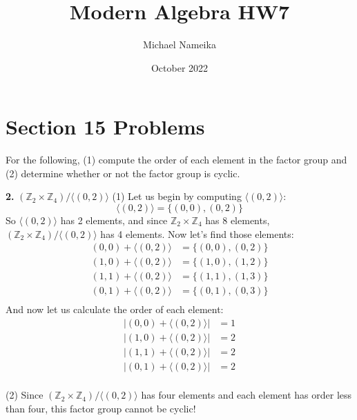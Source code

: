 \documentclass{article}
\title{Modern Algebra HW7}
\author{Michael Nameika}
\date{October 2022}
\begin{document}
\maketitle

\section*{Section 15 Problems}

For the following, (1) compute the order of each element in the factor group and (2) determine whether or not the factor group is cyclic.
\newline

\textbf{2.} $(\mathbb{Z}_2 \times \mathbb{Z}_4)/\langle (0,2) \rangle$
\newline
(1) Let us begin by computing $\langle (0,2) \rangle$:
\[\langle (0,2) \rangle = \{(0,0), (0,2)\}\]
So $\langle (0,2) \rangle$ has 2 elements, and since $\mathbb{Z}_2 \times \mathbb{Z}_4$ has 8 elements, $(\mathbb{Z}_2 \times \mathbb{Z}_4)/\langle (0,2) \rangle$ has 4 elements. Now let's find those elements:
\begin{align*}
    (0,0) + \langle (0,2) \rangle &= \{(0,0), (0,2)\} \\
    (1,0) + \langle (0,2) \rangle &= \{(1,0), (1,2)\} \\
    (1,1) + \langle (0,2) \rangle &= \{(1,1), (1,3)\} \\
    (0,1) + \langle (0,2) \rangle &= \{(0,1), (0,3)\} \\
\end{align*}
And now let us calculate the order of each element:
\begin{align*}
    \left| (0,0) + \langle (0,2) \rangle \right| &= 1 \\
    \left| (1,0) + \langle (0,2) \rangle \right| &= 2 \\
    \left| (1,1) + \langle (0,2) \rangle \right| &= 2 \\
    \left| (0,1) + \langle (0,2) \rangle \right| &= 2 \\
\end{align*}

(2) Since $(\mathbb{Z}_2 \times \mathbb{Z}_4) /\langle (0,2) \rangle$ has four elements and each element has order less than four, this factor group cannot be cyclic!
\newline\newline
\end{document}
